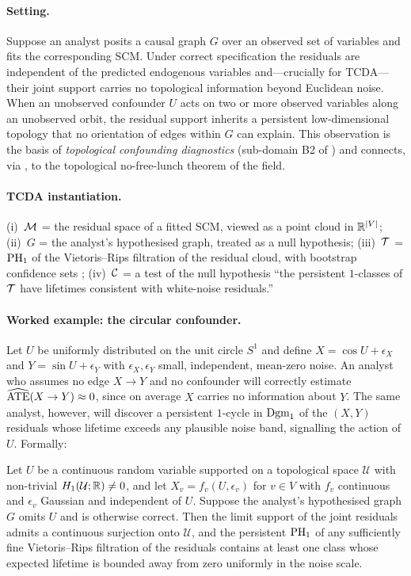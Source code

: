 \paragraph{Setting.}
Suppose an analyst posits a causal graph $G$ over an observed set of
variables and fits the corresponding SCM. Under correct specification
the residuals are independent of the predicted endogenous variables
and---crucially for TCDA---their joint support carries no topological
information beyond Euclidean noise. When an unobserved confounder
$U$ acts on two or more observed variables along an unobserved orbit,
the residual support inherits a persistent low-dimensional topology
that no orientation of edges within $G$ can explain. This observation
is the basis of \emph{topological confounding diagnostics}
(sub-domain B2 of ) and connects, via
\citet{ibeling2021topological}, to the topological no-free-lunch
theorem of the field.

\paragraph{TCDA instantiation.}
(i)~$\mathcal{M}$ = the residual space of a fitted SCM, viewed as a point cloud
in $\mathbb{R}^{|V|}$; (ii)~$G$ = the analyst's hypothesised graph, treated as
a null hypothesis; (iii)~$\mathcal{T}$ = $\mathrm{PH}_{1}$ of the Vietoris--Rips
filtration of the residual cloud, with bootstrap confidence sets
\citep{fasy2014confidence,chazal2013bootstrap}; (iv)~$\mathcal{C}$ = a test of
the null hypothesis ``the persistent $1$-classes of $\mathcal{T}$ have
lifetimes consistent with white-noise residuals.''

\paragraph{Worked example: the circular confounder.}
Let $U$ be uniformly distributed on the unit circle $S^1$ and define
$X = \cos U + \epsilon_X$ and $Y = \sin U + \epsilon_Y$ with
$\epsilon_X, \epsilon_Y$ small, independent, mean-zero noise. An
analyst who assumes no edge $X \to Y$ and no confounder will correctly
estimate $\widehat{\operatorname{ATE}}(X \to Y) \approx 0$, since on average $X$
carries no information about $Y$. The same analyst, however, will
discover a persistent $1$-cycle in $\mathrm{Dgm}_{1}$ of the $(X,Y)$ residuals
whose lifetime exceeds any plausible noise band, signalling the action
of $U$. Formally:

\begin{proposition}
\label{prop:confounding_signature}
Let $U$ be a continuous random variable supported on a topological
space $\mathcal{U}$ with non-trivial $H_1(\mathcal{U};\mathbb{R}) \neq 0$, and
let $X_v = f_v(U,\epsilon_v)$ for $v \in V$ with $f_v$ continuous and
$\epsilon_v$ Gaussian and independent of $U$. Suppose the analyst's
hypothesised graph $G$ omits $U$ and is otherwise correct. Then the
limit support of the joint residuals admits a continuous surjection
onto $\mathcal{U}$, and the persistent $\mathrm{PH}_{1}$ of any sufficiently
fine Vietoris--Rips filtration of the residuals contains at least one
class whose expected lifetime is bounded away from zero uniformly in
the noise scale.
\end{proposition}

